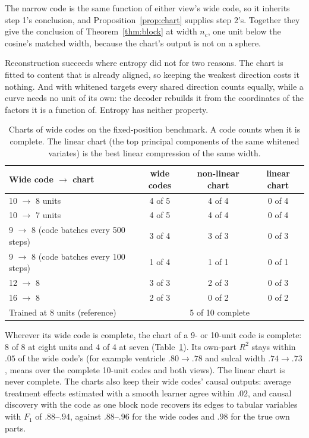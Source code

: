 The narrow code is the same function of either view's wide code, so it inherits
step 1's conclusion, and Proposition~\ref{prop:chart} supplies step 2's.
Together they give the conclusion of Theorem~\ref{thm:block} at width $n_c$, one
unit below the cosine's matched width, because the chart's output is not on a
sphere.

Reconstruction succeeds where entropy did not for two reasons. The chart is
fitted to content that is already aligned, so keeping the weakest direction
costs it nothing. And with whitened targets every shared direction counts
equally, while a curve needs no unit of its own: the decoder rebuilds it from
the coordinates of the factors it is a function of. Entropy has neither
property.

\begin{table}[t]
\centering
\caption{Charts of wide codes on the fixed-position benchmark. A code counts when
it is complete. The linear chart (the top principal components of the same
whitened variates) is the best linear compression of the same width.}
\label{tab:chart}
\begin{tabular}{lccc}
\toprule
Wide code $\to$ chart & wide codes & non-linear chart & linear chart\\
\midrule
10 $\to$ 8 units & 4 of 5 & 4 of 4 & 0 of 4\\
10 $\to$ 7 units & 4 of 5 & 4 of 4 & 0 of 4\\
9 $\to$ 8 (code batches every 500 steps) & 3 of 4 & 3 of 3 & 0 of 3\\
9 $\to$ 8 (code batches every 100 steps) & 1 of 4 & 1 of 1 & 0 of 1\\
12 $\to$ 8 & 3 of 3 & 2 of 3 & 0 of 3\\
16 $\to$ 8 & 2 of 3 & 0 of 2 & 0 of 2\\
\midrule
Trained at 8 units (reference) & \multicolumn{3}{c}{5 of 10 complete}\\
\bottomrule
\end{tabular}
\end{table}

Wherever its wide code is complete, the chart of a 9- or 10-unit code is
complete: 8 of 8 at eight units and 4 of 4 at seven (Table~\ref{tab:chart}). Its
own-part $R^2$ stays within $.05$ of the wide code's (for example ventricle
$.80 \to .78$ and sulcal width $.74 \to .73$, means over the complete 10-unit
codes and both views). The linear chart is never complete. The charts also keep
their wide codes' causal outputs: average treatment effects estimated with a
smooth learner agree within $.02$, and causal discovery with the code as one
block node recovers its edges to tabular variables with $F_1$ of $.88$--$.94$,
against $.88$--$.96$ for the wide codes and $.98$ for the true own parts.

